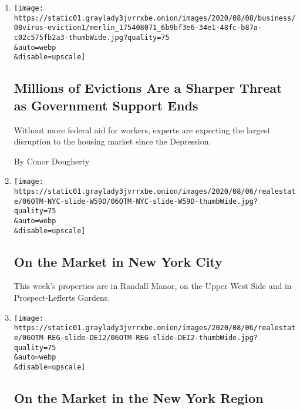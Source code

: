 \begin{enumerate}
\def\labelenumi{\arabic{enumi}.}
\item
  \href{/2020/08/07/business/economy/housing-economy-eviction-renters.html}{}

  \texttt{[image: https://static01.graylady3jvrrxbe.onion/images/2020/08/08/business/08virus-eviction1/merlin\_175408071\_6b9bf3e6-34e1-48fc-b87a-c02c575fb2a3-thumbWide.jpg?quality=75\\\&auto=webp\\\&disable=upscale]}

  \hypertarget{millions-of-evictions-are-a-sharper-threat-as-government-support-ends}{%
  \subsection{Millions of Evictions Are a Sharper Threat as Government
  Support
  Ends}\label{millions-of-evictions-are-a-sharper-threat-as-government-support-ends}}

  Without more federal aid for workers, experts are expecting the
  largest disruption to the housing market since the Depression.

  By Conor Dougherty
\item
  \href{/slideshow/2020/08/06/realestate/on-the-market-in-new-york-city.html}{}

  \texttt{[image: https://static01.graylady3jvrrxbe.onion/images/2020/08/06/realestate/06OTM-NYC-slide-W59D/06OTM-NYC-slide-W59D-thumbWide.jpg?quality=75\\\&auto=webp\\\&disable=upscale]}

  \hypertarget{on-the-market-in-new-york-city}{%
  \subsection{On the Market in New York
  City}\label{on-the-market-in-new-york-city}}

  This week's properties are in Randall Manor, on the Upper West Side
  and in Prospect-Lefferts Gardens.
\item
  \href{/slideshow/2020/08/06/realestate/on-the-market-in-the-new-york-region.html}{}

  \texttt{[image: https://static01.graylady3jvrrxbe.onion/images/2020/08/06/realestate/06OTM-REG-slide-DEI2/06OTM-REG-slide-DEI2-thumbWide.jpg?quality=75\\\&auto=webp\\\&disable=upscale]}

  \hypertarget{on-the-market-in-the-new-york-region}{%
  \subsection{On the Market in the New York
  Region}\label{on-the-market-in-the-new-york-region}}


\end{enumerate}

